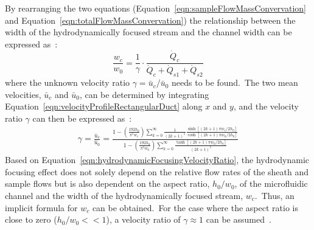 By rearranging the two equations (Equation~\ref{eqn:sampleFlowMassConvervation} and Equation~\ref{eqn:totalFlowMassConvervation}) the relationship between the width of the hydrodynamically focused stream and the channel width can be expressed as~\cite{Lee2006}:\
\begin{equation}
	\frac{w_{c}}{w_{0}} = \frac{1}{\gamma} \cdot \frac{\dot{Q}_{c}}{\dot{Q}_{c}+\dot{Q}_{s1}+\dot{Q}_{s2}}
	\label{eqn:hydrodynamicFocusingWidthRatio}
\end{equation}
where the unknown velocity ratio $\gamma=\bar{u}_{c}/\bar{u}_{0}$ needs to be found.\ The two mean velocities, $\bar{u}_{c}$ and $\bar{u}_{0}$, can be determined by integrating Equation~\ref{eqn:velocityProfileRectangularDuct} along $x$ and $y$, and the velocity ratio $\gamma$ can then be expressed as~\cite{Lee2006}:\
\begin{eqnarray}
	\gamma = \frac{\bar{u}_{c}}{\bar{u}_{0}} = \frac{1-\left( \frac{192 h_{0}}{\pi^{5}w_{c}}\right)\sum_{k=0}^{\infty}\frac{1}{(2k+1)^{5}}\frac{\sinh[(2k+1)\pi w_{c}/2h_{0}]}{\cosh[(2k+1)\pi w_{0}/2h_{0}]}}{1-\left(\frac{192 h_{0}}{\pi^{5}w_{0}}\right)\sum_{k=0}^{\infty}\frac{\tanh[(2k+1)\pi w_{0}/2h_{0}]}{(2k+1)^{5}}}
	\label{eqn:hydrodynamicFocusingVelocityRatio}
\end{eqnarray}
Based on Equation~\ref{eqn:hydrodynamicFocusingVelocityRatio}, the hydrodynamic focusing effect does not solely depend on the relative flow rates of the sheath and sample flows but is also dependent on the aspect ratio, $h_{0}/w_{0}$,  of the microfluidic channel and the width of the hydrodynamically focused stream, $w_{c}$.\ Thus, an implicit formula for $w_{c}$ can be obtained.\ For the case where the aspect ratio is close to zero ($h_{0}/w_{0} << 1$), a velocity ratio of $\gamma \approx 1$ can be assumed~\cite{Stiles2005}.\
%
